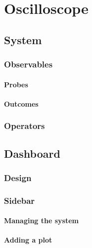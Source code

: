 \chapter{Oscilloscope}
    
    
    









    
\iffalse
\section{System}
        \subsection{Observables}
            \subsubsection{Probes}
            \subsubsection{Outcomes}
        \subsection{Operators}
   \section{Dashboard}
        \subsection{Design}
        \subsection{Sidebar}
            \subsubsection{Managing the system}
            
            \subsubsection{Adding a plot}
